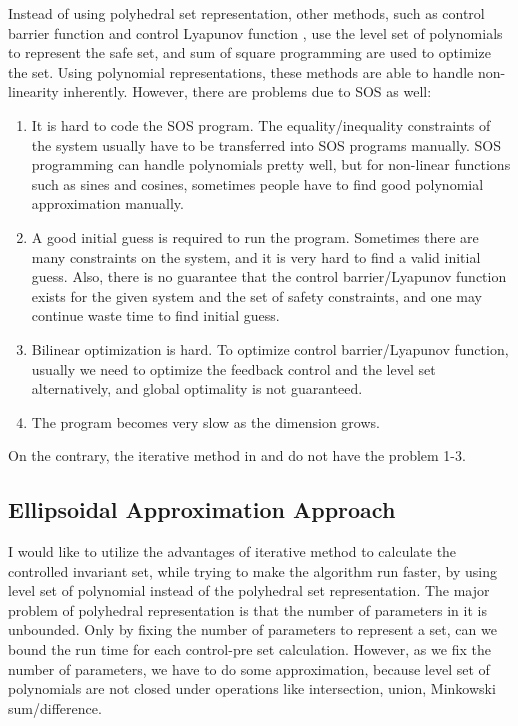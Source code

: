 \documentclass{article}
\begin{document}
Instead of using polyhedral set representation, other methods, such as control barrier function \cite{control-barrier} and control Lyapunov function \cite{sos-tracking}, use the level set of polynomials to represent the safe set, and sum of square programming are used to optimize the set. Using polynomial representations, these methods are able to handle non-linearity inherently. However, there are problems due to SOS as well:
\begin{enumerate}
    \item It is hard to code the SOS program. The equality/inequality constraints of the system usually have to be transferred into SOS programs manually. SOS programming can handle polynomials pretty well, but for non-linear functions such as sines and cosines, sometimes people have to find good polynomial approximation manually.
    \item A good initial guess is required to run the program. Sometimes there are many constraints on the system, and it is very hard to find a valid initial guess. Also, there is no guarantee that the control barrier/Lyapunov function exists for the given system and the set of safety constraints, and one may continue waste time to find initial guess. 
    \item Bilinear optimization is hard. To optimize control barrier/Lyapunov function, usually we need to optimize the feedback control and the level set alternatively, and global optimality is not guaranteed.
    \item The program becomes very slow as the dimension grows.
\end{enumerate}

On the contrary, the iterative method in \cite{correct-by-construction} and \cite{lk-cinvs} do not have the problem 1-3.

\subsection{Ellipsoidal Approximation Approach}
I would like to utilize the advantages of iterative method to calculate the controlled invariant set, while trying to make the algorithm run faster, by using level set of polynomial instead of the polyhedral set representation. The major problem of polyhedral representation is that the number of parameters in it is unbounded. Only by fixing the number of parameters to represent a set, can we bound the run time for each control-pre set calculation. However, as we fix the number of parameters, we have to do some approximation, because level set of polynomials are not closed under operations like intersection, union, Minkowski sum/difference.\\
\end{document}
